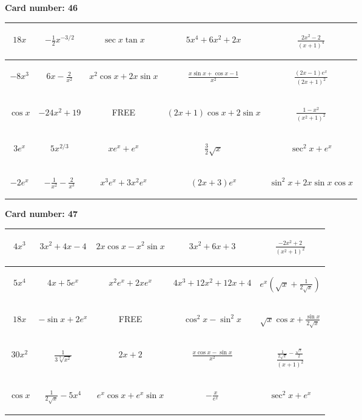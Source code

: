 \documentclass{article}
\newcommand{\entry}[1]{\begin{minipage}[t][2.75cm][t]{4cm} \vspace{1cm} \begin{center}#1\end{center} \end{minipage}}
\newcommand{\freespace}{\entry{FREE}}
\newcommand{\cardnumber}[1]{\noindent \textbf{Card number: #1} \bigskip}
\begin{document}
\pagebreak

\cardnumber{46}
\begin{center}
\begin{tabular}{|*{5}{c|}}
    \hline
    \entry{$18x$} & \entry{$-\frac{1}{2} x^{-3/2}$} & \entry{$\sec x \tan x$} & \entry{$5x^4 + 6x^2 + 2x$} & \entry{$\frac{2x^2 - 2}{(x + 1)^4}$} \\ \hline
    \entry{$-8x^3$} & \entry{$6x - \frac{2}{x^2}$} & \entry{$x^2 \cos x + 2x \sin x$} & \entry{$\frac{x \sin x + \cos x - 1}{x^2}$} & \entry{$\frac{(2x - 1) e^x}{(2x + 1)^2}$} \\ \hline
    \entry{$\cos x$} & \entry{$-24x^2 + 19$} & \freespace & \entry{$(2x + 1) \cos x + 2 \sin x$} & \entry{$\frac{1 - x^2}{(x^2 + 1)^2}$} \\ \hline
    \entry{$3e^x$} & \entry{$5x^{2/3}$} & \entry{$x e^x + e^x$} & \entry{$\frac{3}{2} \sqrt{x}$} & \entry{$\sec^2 x + e^x$} \\ \hline
    \entry{$-2e^x$} & \entry{$-\frac{1}{x^2} - \frac{2}{x^3}$} & \entry{$x^3 e^x + 3x^2 e^x$} & \entry{$(2x + 3) e^x$} & \entry{$\sin^2 x + 2x \sin x \cos x$} \\ \hline
\end{tabular}
\end{center}

\pagebreak

\cardnumber{47}
\begin{center}
\begin{tabular}{|*{5}{c|}}
    \hline
    \entry{$4x^3$} & \entry{$3x^2 + 4x - 4$} & \entry{$2x \cos x - x^2 \sin x$} & \entry{$3x^2 + 6x + 3$} & \entry{$\frac{-2x^2 + 2}{(x^2 + 1)^2}$} \\ \hline
    \entry{$5x^4$} & \entry{$4x + 5e^x$} & \entry{$x^2 e^x + 2x e^x$} & \entry{$4x^3 + 12x^2 + 12x + 4$} & \entry{$e^x \left(\sqrt{x} + \frac{1}{2\sqrt{x}}\right)$} \\ \hline
    \entry{$18x$} & \entry{$-\sin x + 2e^x$} & \freespace & \entry{$\cos^2 x - \sin^2 x$} & \entry{$\sqrt{x} \cos x + \frac{\sin x}{2 \sqrt{x}}$} \\ \hline
    \entry{$30x^2$} & \entry{$\frac{1}{3\sqrt[3]{x^2}}$} & \entry{$2x + 2$} & \entry{$\frac{x \cos x - \sin x}{x^2}$} & \entry{$\frac{\frac{1}{2 \sqrt{x}} - \frac{\sqrt{x}}{2}}{(x + 1)^2}$} \\ \hline
    \entry{$\cos x$} & \entry{$\frac{1}{2\sqrt{x}} - 5x^4$} & \entry{$e^x \cos x + e^x \sin x$} & \entry{$-\frac{x}{e^x}$} & \entry{$\sec^2 x + e^x$} \\ \hline
\end{tabular}
\end{center}
\end{document}
